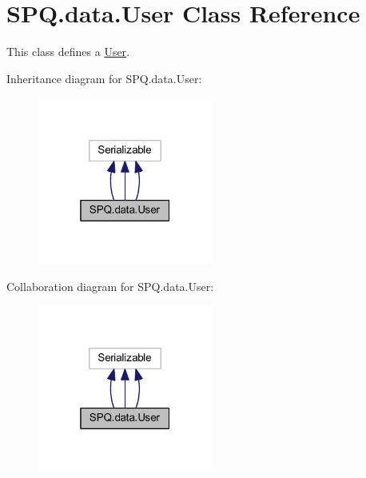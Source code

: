 \hypertarget{class_s_p_q_1_1data_1_1_user}{}\section{S\+P\+Q.\+data.\+User Class Reference}
\label{class_s_p_q_1_1data_1_1_user}


This class defines a \mbox{\hyperlink{class_s_p_q_1_1data_1_1_user}{User}}.  




Inheritance diagram for S\+P\+Q.\+data.\+User\+:\nopagebreak
\begin{figure}[H]
\begin{center}
\leavevmode
\includegraphics[width=163pt]{class_s_p_q_1_1data_1_1_user__inherit__graph}
\end{center}
\end{figure}


Collaboration diagram for S\+P\+Q.\+data.\+User\+:\nopagebreak
\begin{figure}[H]
\begin{center}
\leavevmode
\includegraphics[width=163pt]{class_s_p_q_1_1data_1_1_user__coll__graph}
\end{center}
\end{figure}
